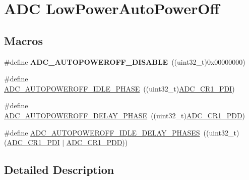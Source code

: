 \hypertarget{group___a_d_c___low_power_auto_power_off}{\section{A\-D\-C Low\-Power\-Auto\-Power\-Off}
\label{group___a_d_c___low_power_auto_power_off}
}
\subsection*{Macros}
\begin{DoxyCompactItemize}
\item 
\hypertarget{group___a_d_c___low_power_auto_power_off_ga40ac55438221e5daf1adfffdfd4c87dd}{\#define {\bfseries A\-D\-C\-\_\-\-A\-U\-T\-O\-P\-O\-W\-E\-R\-O\-F\-F\-\_\-\-D\-I\-S\-A\-B\-L\-E}~((uint32\-\_\-t)0x00000000)}\label{group___a_d_c___low_power_auto_power_off_ga40ac55438221e5daf1adfffdfd4c87dd}

\item 
\#define \hyperlink{group___a_d_c___low_power_auto_power_off_ga5b7d6c5a7bd748c4ab4ee0125e85c000}{A\-D\-C\-\_\-\-A\-U\-T\-O\-P\-O\-W\-E\-R\-O\-F\-F\-\_\-\-I\-D\-L\-E\-\_\-\-P\-H\-A\-S\-E}~((uint32\-\_\-t)\hyperlink{group___peripheral___registers___bits___definition_ga2476fa628e5eea4039bb8c9e92305b60}{A\-D\-C\-\_\-\-C\-R1\-\_\-\-P\-D\-I})
\item 
\#define \hyperlink{group___a_d_c___low_power_auto_power_off_gad9724ceb96cbb0a548a09ca4966098c9}{A\-D\-C\-\_\-\-A\-U\-T\-O\-P\-O\-W\-E\-R\-O\-F\-F\-\_\-\-D\-E\-L\-A\-Y\-\_\-\-P\-H\-A\-S\-E}~((uint32\-\_\-t)\hyperlink{group___peripheral___registers___bits___definition_gae4fd2bb84d93f32bb0a0ac1ea2270433}{A\-D\-C\-\_\-\-C\-R1\-\_\-\-P\-D\-D})
\item 
\#define \hyperlink{group___a_d_c___low_power_auto_power_off_gaf9657a901b768c1dfd3eb8c06d1627d1}{A\-D\-C\-\_\-\-A\-U\-T\-O\-P\-O\-W\-E\-R\-O\-F\-F\-\_\-\-I\-D\-L\-E\-\_\-\-D\-E\-L\-A\-Y\-\_\-\-P\-H\-A\-S\-E\-S}~((uint32\-\_\-t)(\hyperlink{group___peripheral___registers___bits___definition_ga2476fa628e5eea4039bb8c9e92305b60}{A\-D\-C\-\_\-\-C\-R1\-\_\-\-P\-D\-I} $\vert$ \hyperlink{group___peripheral___registers___bits___definition_gae4fd2bb84d93f32bb0a0ac1ea2270433}{A\-D\-C\-\_\-\-C\-R1\-\_\-\-P\-D\-D}))
\end{DoxyCompactItemize}


\subsection{Detailed Description}


